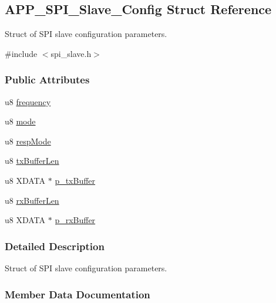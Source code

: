 \hypertarget{struct_a_p_p___s_p_i___slave___config}{}\subsection{A\+P\+P\+\_\+\+S\+P\+I\+\_\+\+Slave\+\_\+\+Config Struct Reference}
\label{struct_a_p_p___s_p_i___slave___config}


Struct of S\+PI slave configuration parameters.  




{\ttfamily \#include $<$spi\+\_\+slave.\+h$>$}

\subsubsection*{Public Attributes}
\begin{DoxyCompactItemize}
\item 
u8 \hyperlink{struct_a_p_p___s_p_i___slave___config_adba7c45b165b8aa739010b156bb471c5}{frequency}
\item 
u8 \hyperlink{struct_a_p_p___s_p_i___slave___config_ab08cda8990f31dd79e07c36108532523}{mode}
\item 
u8 \hyperlink{struct_a_p_p___s_p_i___slave___config_ab6dd24452cc1f01d12b37d79421c5bbf}{resp\+Mode}
\item 
u8 \hyperlink{struct_a_p_p___s_p_i___slave___config_a6fbfdb577369d6b2e3b95184ed5baa6c}{tx\+Buffer\+Len}
\item 
u8 X\+D\+A\+TA $\ast$ \hyperlink{struct_a_p_p___s_p_i___slave___config_a467491e014e2b19dbe625dfb338e9f16}{p\+\_\+tx\+Buffer}
\item 
u8 \hyperlink{struct_a_p_p___s_p_i___slave___config_a6b461b7c3aebf881e2fe2f2d867b2538}{rx\+Buffer\+Len}
\item 
u8 X\+D\+A\+TA $\ast$ \hyperlink{struct_a_p_p___s_p_i___slave___config_a1b90cf577f94dbf0c0b1d117fef45c6a}{p\+\_\+rx\+Buffer}
\end{DoxyCompactItemize}


\subsubsection{Detailed Description}
Struct of S\+PI slave configuration parameters. 

\subsubsection{Member Data Documentation}
